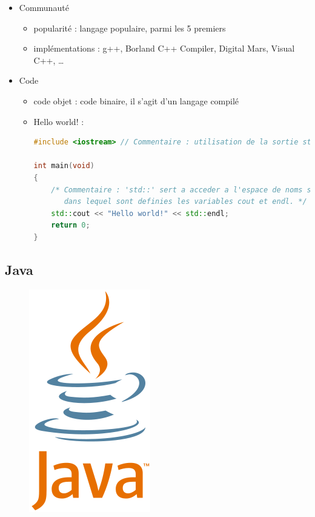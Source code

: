 \begin{itemize}
\begin{itemize}
	\end{itemize}
\item Communauté
	\begin{itemize}
	\item popularité : langage populaire, parmi les 5 premiers
	\item implémentations : g++, Borland C++ Compiler, Digital Mars, Visual C++, …\\
	\end{itemize}
\item Code
	\begin{itemize}
	\item code objet : code binaire, il s'agit d'un langage compilé
	\item Hello world! :
\begin{lstlisting}[language=c++]
#include <iostream> // Commentaire : utilisation de la sortie standard

int main(void)
{
    /* Commentaire : 'std::' sert a acceder a l'espace de noms std,
       dans lequel sont definies les variables cout et endl. */
    std::cout << "Hello world!" << std::endl;
    return 0;
}
\end{lstlisting}
	\end{itemize}
\end{itemize}

\newpage

\subsection{Java}

\begin{figure}[!ht]
	\center
	\includegraphics[scale=0.3]{img/java}
\end{figure}

